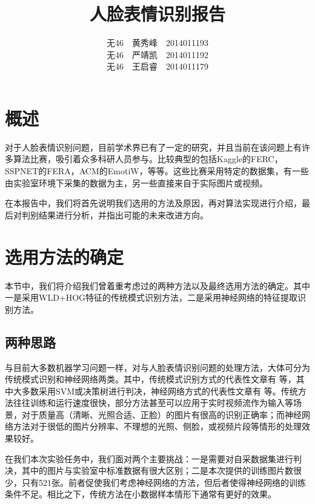 \documentclass[UTF8]{ctexart}
\begin{document}
\title{人脸表情识别报告}
\author{无46\ \ 黄秀峰\ \ 2014011193\\ 无46\ \ 严靖凯\ \ 2014011192\\ 无46\ \ 王启睿\ \ 2014011179}
\maketitle

\section{概述}

对于人脸表情识别问题，目前学术界已有了一定的研究，并且当前在该问题上有许多算法比赛，吸引着众多科研人员参与。比较典型的包括Kaggle的FERC，SSPNET的FERA，ACM的EmotiW，等等。这些比赛采用特定的数据集，有一些由实验室环境下采集的数据为主，另一些直接来自于实际图片或视频。

在本报告中，我们将首先说明我们选用的方法及原因，再对算法实现进行介绍，最后对判别结果进行分析，并指出可能的未来改进方向。

\section{选用方法的确定}

本节中，我们将介绍我们曾着重考虑过的两种方法以及最终选用方法的确定。其中一是采用WLD+HOG特征的传统模式识别方法，二是采用神经网络的特征提取识别方法。

\subsection{两种思路}

与目前大多数机器学习问题一样，对与人脸表情识别问题的处理方法，大体可分为传统模式识别和神经网络两类。其中，传统模式识别方式的代表性文章有
\cite{happy2015automatic,islam2016sention,wang2013feature,salmam2016facial}等，其中大多数采用SVM或决策树进行判决，神经网络方式的代表性文章有
\cite{BarsoumICMI2016,khorrami2015deep}等。传统方法往往训练和运行速度很快，部分方法甚至可以应用于实时视频流作为输入等场景，对于质量高（清晰、光照合适、正脸）的图片有很高的识别正确率；而神经网络方法对于很低的图片分辨率、不理想的光照、侧脸，或视频片段等情形的处理效果较好。

在我们本次实验任务中，我们面对两个主要挑战：一是需要对自采数据集进行判决，其中的图片与实验室中标准数据有很大区别；二是本次提供的训练图片数很少，只有521张。前者促使我们考虑神经网络的方法，但后者使得神经网络的训练条件不足。相比之下，传统方法在小数据样本情形下通常有更好的效果。
\end{document}
